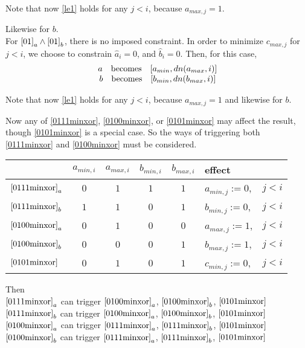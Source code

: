 \documentclass{article}
\begin{document}
Note that now \eqref{le1} holds for any $j < i$, because $a_{max,j} = 1$.

Likewise for $b$.\\
For $\eqref{01}_a  \wedge  \eqref{01}_b$, there is no imposed constraint.
In order to minimize $c_{max,j}$ for $j<i$, 
we choose to constrain $\hat a_i = 0$, and $\hat b_i = 0$.
Then, for this case, 
\begin{equation}\label{0101minxor}
\begin{tabular}{c}
$a \quad \text{becomes} \quad [a_{min}, dn(a_{max},i)]$\\
$b \quad \text{becomes} \quad [b_{min}, dn(b_{max},i)]$
\end{tabular}
\end{equation}

Note that now \eqref{le1} holds for any $j < i$, because $a_{max,j} = 1$ and likewise for $b$.

Now any of \eqref{0111minxor}, \eqref{0100minxor}, or \eqref{0101minxor} 
may affect the result, though \eqref{0101minxor}
is a special case.
So the ways of triggering both
\eqref{0111minxor} and \eqref{0100minxor}
must be considered. 
\vspace{10pt}

\begin{tabular}{l|c|c|c|c|l r}
& $a_{min,i}$ & $a_{max,i}$ & $b_{min,i}$ & $b_{max,i}$ & effect &\\
\hline
$\eqref{0111minxor}_a$ & $0$ & $1$ & $1$ & $1$ & 
$a_{min,j} := 0$, \;& $j < i$ \\
\hline
$\eqref{0111minxor}_b$ & $1$ & $1$ & $0$ & $1$ & 
$b_{min,j} := 0$, \;& $j < i$ \\
\hline
$\eqref{0100minxor}_a$ & $0$ & $1$ & $0$ & $0$ & 
$a_{max,j} := 1$, \;& $j < i$ \\
\hline
$\eqref{0100minxor}_b$ & $0$ & $0$ & $0$ & $1$ & 
$b_{max,j} := 1$, \;& $j < i$ \\
\hline
$\eqref{0101minxor}$ & $0$ & $1$ & $0$ & $1$ & 
$c_{min,j} := 0$, \;& $j < i$ \\
\end{tabular}
\vspace{10pt}

Then\\
$\eqref{0111minxor}_a$ \quad can trigger \quad $\eqref{0100minxor}_a$,
$\eqref{0100minxor}_b$, $\eqref{0101minxor}$\\
$\eqref{0111minxor}_b$ \quad can trigger \quad $\eqref{0100minxor}_a$,
$\eqref{0100minxor}_b$, $\eqref{0101minxor}$\\
$\eqref{0100minxor}_a$ \quad can trigger \quad $\eqref{0111minxor}_a$,
$\eqref{0111minxor}_b$, $\eqref{0101minxor}$\\
$\eqref{0100minxor}_b$ \quad can trigger \quad $\eqref{0111minxor}_a$,
$\eqref{0111minxor}_b$, $\eqref{0101minxor}$\\
\end{document}
